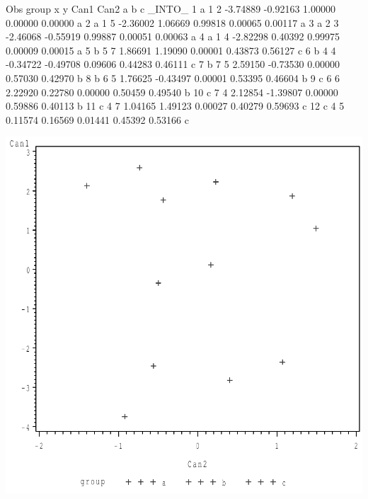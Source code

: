 \documentclass{article}
\begin{document}
\begin{Woutput}
Obs    group    x    y      Can1        Can2         a          b          c       _INTO_
  1      a      1    2    -3.74889    -0.92163    1.00000    0.00000    0.00000      a
  2      a      1    5    -2.36002     1.06669    0.99818    0.00065    0.00117      a
  3      a      2    3    -2.46068    -0.55919    0.99887    0.00051    0.00063      a
  4      a      1    4    -2.82298     0.40392    0.99975    0.00009    0.00015      a
  5      b      5    7     1.86691     1.19090    0.00001    0.43873    0.56127      c
  6      b      4    4    -0.34722    -0.49708    0.09606    0.44283    0.46111      c
  7      b      7    5     2.59150    -0.73530    0.00000    0.57030    0.42970      b
  8      b      6    5     1.76625    -0.43497    0.00001    0.53395    0.46604      b
  9      c      6    6     2.22920     0.22780    0.00000    0.50459    0.49540      b
 10      c      7    4     2.12854    -1.39807    0.00000    0.59886    0.40113      b
 11      c      4    7     1.04165     1.49123    0.00027    0.40279    0.59693      c
 12      c      4    5     0.11574     0.16569    0.01441    0.45392    0.53166      c
\end{Woutput}
\includegraphics[]{mixup-2-SAS-fig.pdf}
\end{document}
